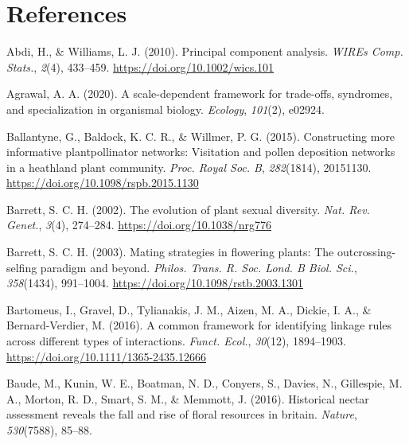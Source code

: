 \documentclass[
  12pt,
  a4paper,
]{article}
\newlength{\cslhangindent}
\newlength{\cslentryspacingunit} %
\newenvironment{CSLReferences}[2] %
 {%
  \setlength{\parindent}{0pt}
  \ifodd #1
  \let\oldpar\par
  \def\par{\hangindent=\cslhangindent\oldpar}
  \fi
  \setlength{\parskip}{#2\cslentryspacingunit}
 }%
 {}
\begin{document}
\hypertarget{references}{%
\section{References}\label{references}}

\hypertarget{refs}{}
\begin{CSLReferences}{1}{0}
\leavevmode{}%
Abdi, H., \& Williams, L. J. (2010). Principal component analysis. \emph{WIREs Comp. Stats.}, \emph{2}(4), 433--459. \url{https://doi.org/10.1002/wics.101}

\leavevmode{}%
Agrawal, A. A. (2020). A scale-dependent framework for trade-offs, syndromes, and specialization in organismal biology. \emph{Ecology}, \emph{101}(2), e02924.

\leavevmode{}%
Ballantyne, G., Baldock, K. C. R., \& Willmer, P. G. (2015). Constructing more informative plant\textendash pollinator networks: Visitation and pollen deposition networks in a heathland plant community. \emph{Proc. Royal Soc. B}, \emph{282}(1814), 20151130. \url{https://doi.org/10.1098/rspb.2015.1130}

\leavevmode{}%
Barrett, S. C. H. (2002). The evolution of plant sexual diversity. \emph{Nat. Rev. Genet.}, \emph{3}(4), 274--284. \url{https://doi.org/10.1038/nrg776}

\leavevmode{}%
Barrett, S. C. H. (2003). Mating strategies in flowering plants: The outcrossing-selfing paradigm and beyond. \emph{Philos. Trans. R. Soc. Lond. B Biol. Sci.}, \emph{358}(1434), 991--1004. \url{https://doi.org/10.1098/rstb.2003.1301}

\leavevmode{}%
Bartomeus, I., Gravel, D., Tylianakis, J. M., Aizen, M. A., Dickie, I. A., \& Bernard-Verdier, M. (2016). A common framework for identifying linkage rules across different types of interactions. \emph{Funct. Ecol.}, \emph{30}(12), 1894--1903. \url{https://doi.org/10.1111/1365-2435.12666}

\leavevmode{}%
Baude, M., Kunin, W. E., Boatman, N. D., Conyers, S., Davies, N., Gillespie, M. A., Morton, R. D., Smart, S. M., \& Memmott, J. (2016). Historical nectar assessment reveals the fall and rise of floral resources in britain. \emph{Nature}, \emph{530}(7588), 85--88.


\end{CSLReferences}
\end{document}
